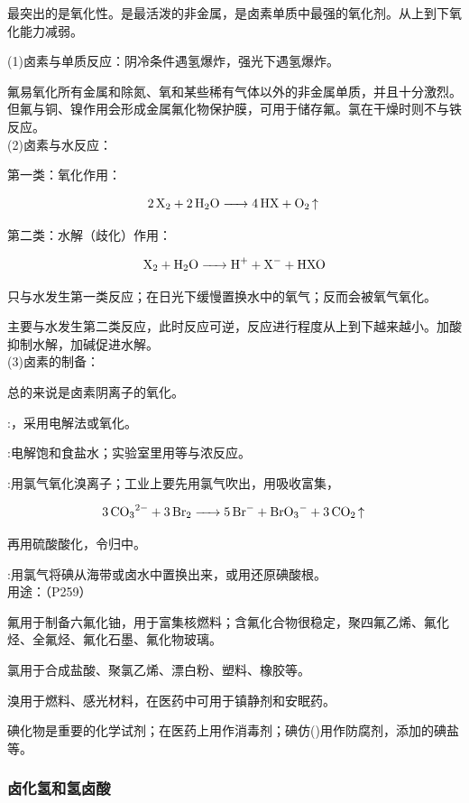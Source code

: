 \documentclass[a4paper,UTF8]{article}
\begin{document}
最突出的是氧化性。是最活泼的非金属，是卤素单质中最强的氧化剂。从上到下氧化能力减弱。

(1)卤素与单质反应：阴冷条件遇氢爆炸，强光下遇氢爆炸。

氟易氧化所有金属和除氮、氧和某些稀有气体以外的非金属单质，并且十分激烈。但氟与铜、镍作用会形成金属氟化物保护膜，可用于储存氟。氯在干燥时则不与铁反应。\\

(2)卤素与水反应：

第一类：氧化作用：

$$ \ce{2X2 + 2H2O -> 4HX + O2 ^} $$

第二类：水解（歧化）作用：

$$ \ce{X2 + H2O -> H+ + X- + HXO} $$

只与水发生第一类反应；在日光下缓慢置换水中的氧气；反而会被氧气氧化。

主要与水发生第二类反应，此时反应可逆，反应进行程度从上到下越来越小。加酸抑制水解，加碱促进水解。\\

(3)卤素的制备：

总的来说是卤素阴离子的氧化。

:，采用电解法或氧化。

:电解饱和食盐水；实验室里用等与浓反应。

:用氯气氧化溴离子；工业上要先用氯气吹出，用吸收富集，

$$ \ce{3CO3^2- + 3Br2 -> 5Br- + BrO3- + 3CO2 ^} $$

再用硫酸酸化，令归中。

:用氯气将碘从海带或卤水中置换出来，或用还原碘酸根。\\

用途：（P259）

氟用于制备六氟化铀，用于富集核燃料；含氟化合物很稳定，聚四氟乙烯、氟化烃、全氟烃、氟化石墨、氟化物玻璃。

氯用于合成盐酸、聚氯乙烯、漂白粉、塑料、橡胶等。

溴用于燃料、感光材料，在医药中可用于镇静剂和安眠药。

碘化物是重要的化学试剂；在医药上用作消毒剂；碘仿()用作防腐剂，添加的碘盐等。

\subsubsection{卤化氢和氢卤酸}
\end{document}
